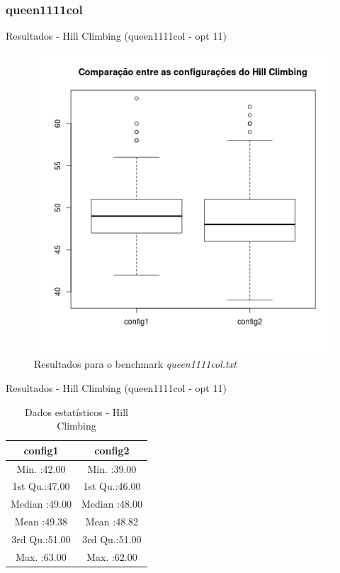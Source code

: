 \documentclass[compress, hide notes]{beamer}
\begin{document}
        
        
        \subsubsection{queen1111col}
		
        \begin{frame}{Resultados - Hill Climbing (queen1111col - opt 11)}
        
        	\begin{figure}[H]
			\centering
            \label{fig:sol-hc-queen1111col}
            \includegraphics[width=0.6\linewidth]{img/hill-sol-queen1111col.png}
            \caption[Resultados para o benchmark queen1111col.txt]{Resultados para o benchmark \textit{queen1111col.txt}}
			\end{figure}

		\end{frame}
        
        \begin{frame}{Resultados - Hill Climbing (queen1111col - opt 11)}
        
        	\begin{table}[H]
            \centering
              \begin{tabular}{c|c}
               \textbf{config1}       &  \textbf{config2}                        \\ \hline \hline
               Min.   :42.00 &          Min.   :39.00          \\ \hline
               1st Qu.:47.00 &          1st Qu.:46.00          \\ \hline
               Median :49.00 &          Median :48.00          \\ \hline
               Mean   :49.38 &          Mean   :48.82          \\ \hline
               3rd Qu.:51.00 &          3rd Qu.:51.00          \\ \hline
               Max.   :63.00 &         Max.   :62.00           \\ 
              \end{tabular}
              \caption {Dados estatísticos - Hill Climbing}
        	\end{table}

		\end{frame}
        
\end{document}
